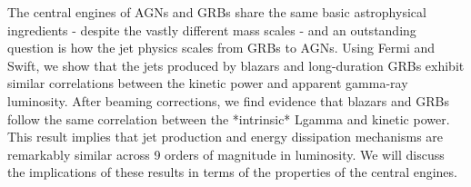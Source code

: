 


\bigskip



\bigskip

\noindent The central engines of AGNs and GRBs share the same basic astrophysical ingredients - despite the vastly different mass scales - and an outstanding question is how the jet physics scales from GRBs to AGNs. Using Fermi and Swift, we show that the jets produced by blazars and long-duration GRBs exhibit similar correlations between the kinetic power and apparent gamma-ray luminosity. After beaming corrections, we find evidence that blazars and GRBs follow the same correlation between the *intrinsic* Lgamma and kinetic power. This result implies that jet production and energy dissipation mechanisms are remarkably similar across 9 orders of magnitude in luminosity. We will discuss the implications of these results in terms of the properties of the central engines.
